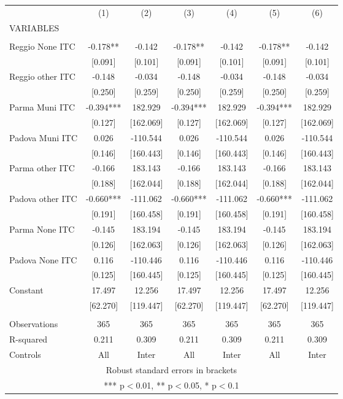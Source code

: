 \begin{tabular}{lcccccc} \hline
 & (1) & (2) & (3) & (4) & (5) & (6) \\
VARIABLES &  &  &  &  &  &  \\ \hline
 &  &  &  &  &  &  \\
Reggio None ITC & -0.178** & -0.142 & -0.178** & -0.142 & -0.178** & -0.142 \\
 & [0.091] & [0.101] & [0.091] & [0.101] & [0.091] & [0.101] \\
Reggio other ITC & -0.148 & -0.034 & -0.148 & -0.034 & -0.148 & -0.034 \\
 & [0.250] & [0.259] & [0.250] & [0.259] & [0.250] & [0.259] \\
Parma Muni ITC & -0.394*** & 182.929 & -0.394*** & 182.929 & -0.394*** & 182.929 \\
 & [0.127] & [162.069] & [0.127] & [162.069] & [0.127] & [162.069] \\
Padova Muni ITC & 0.026 & -110.544 & 0.026 & -110.544 & 0.026 & -110.544 \\
 & [0.146] & [160.443] & [0.146] & [160.443] & [0.146] & [160.443] \\
Parma other ITC & -0.166 & 183.143 & -0.166 & 183.143 & -0.166 & 183.143 \\
 & [0.188] & [162.044] & [0.188] & [162.044] & [0.188] & [162.044] \\
Padova other ITC & -0.660*** & -111.062 & -0.660*** & -111.062 & -0.660*** & -111.062 \\
 & [0.191] & [160.458] & [0.191] & [160.458] & [0.191] & [160.458] \\
Parma None ITC & -0.145 & 183.194 & -0.145 & 183.194 & -0.145 & 183.194 \\
 & [0.126] & [162.063] & [0.126] & [162.063] & [0.126] & [162.063] \\
Padova None ITC & 0.116 & -110.446 & 0.116 & -110.446 & 0.116 & -110.446 \\
 & [0.125] & [160.445] & [0.125] & [160.445] & [0.125] & [160.445] \\
Constant & 17.497 & 12.256 & 17.497 & 12.256 & 17.497 & 12.256 \\
 & [62.270] & [119.447] & [62.270] & [119.447] & [62.270] & [119.447] \\
 &  &  &  &  &  &  \\
Observations & 365 & 365 & 365 & 365 & 365 & 365 \\
R-squared & 0.211 & 0.309 & 0.211 & 0.309 & 0.211 & 0.309 \\
 Controls & All & Inter & All & Inter & All & Inter \\ \hline
\multicolumn{7}{c}{ Robust standard errors in brackets} \\
\multicolumn{7}{c}{ *** p$<$0.01, ** p$<$0.05, * p$<$0.1} \\
\end{tabular}
